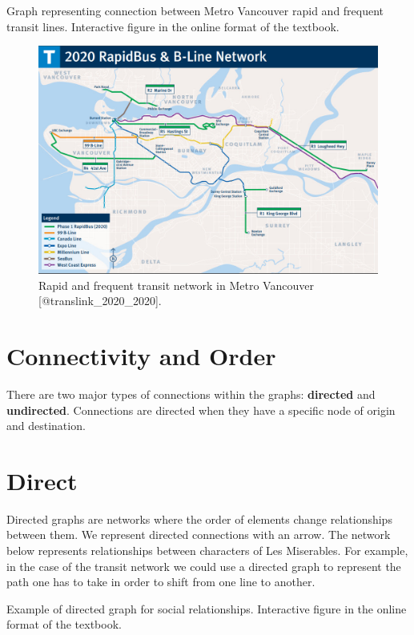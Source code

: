 \documentclass[
]{book}
\begin{document}
\label{fig:8-vancouver-transit-graph}Graph representing connection between Metro Vancouver rapid and frequent transit lines. Interactive figure in the online format of the textbook.

\begin{figure}
\includegraphics[width=15.93in]{images/08-metro_vancouver_transit_network} \caption{Rapid and frequent transit network in Metro Vancouver [@translink_2020_2020].}\label{fig:8-vancouver-transit-network}
\end{figure}

\section{Connectivity and Order}\label{connectivity-and-order}

There are two major types of connections within the graphs: \textbf{directed} and \textbf{undirected}. Connections are directed when they have a specific node of origin and destination.

\section{Direct}\label{direct}

Directed graphs are networks where the order of elements change relationships between them. We represent directed connections with an arrow. The network below represents relationships between characters of Les Miserables. For example, in the case of the transit network we could use a directed graph to represent the path one has to take in order to shift from one line to another.

\label{fig:8-directed-graph}Example of directed graph for social relationships. Interactive figure in the online format of the textbook.
\end{document}
